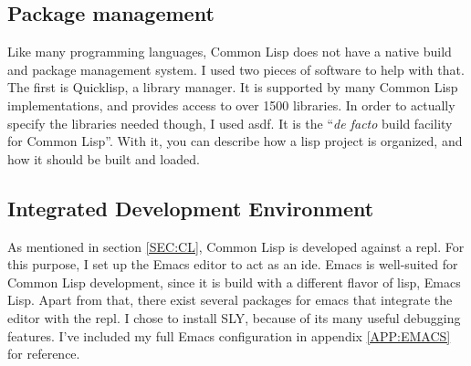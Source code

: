 
\label{SEC:DEV_ENV}

\subsection{Package management}

Like many programming languages,
Common Lisp does not have a native build and package management system.
I used two pieces of software to help with that.
The first is Quicklisp,
a library manager.
It is supported by many Common Lisp implementations,
and provides access to over 1500 libraries.\cite{quicklisp}
In order to actually specify the libraries needed though,
I used \ac{asdf}.
It is the ``\textit{de facto} build facility for Common Lisp''\cite{asdf}.
With it,
you can describe how a lisp project is organized,
and how it should be built and loaded.

\subsection{Integrated Development Environment}

As mentioned in section \ref{SEC:CL},
Common Lisp is developed against a \ac{repl}.
For this purpose,
I set up the Emacs editor to act as an \ac{ide}.
Emacs is well-suited for Common Lisp development,
since it is build with a different flavor of lisp,
Emacs Lisp.
Apart from that,
there exist several packages for emacs that integrate the editor with the \ac{repl}.
I chose to install SLY,
because of its many useful debugging features.
I've included my full Emacs configuration in appendix \ref{APP:EMACS} for reference.
